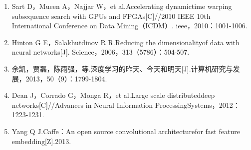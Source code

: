 \documentclass{article}
\begin{document}
\begin{enumerate}[labelsep = 0em, leftmargin = 10pt, itemindent = 0em]
        \item  Sart D，Mueen A，Najjar W，et al.Accelerating dynamictime warping subsequence search with GPUs and FPGAs[C]//2010 IEEE 10th International Conference on Data Mining（ICDM）. ieee，2010：1001-1006.
        \item  Hinton G E，Salakhutdinov R R.Reducing the dimensionalityof data with neural networks[J]. Science，2006，313（5786）：504-507.
        \item  余凯，贾磊，陈雨强，等.深度学习的昨天、今天和明天[J].计算机研究与发展，2013，50（9）：1799-1804.
        \item  Dean J，Corrado G，Monga R，et al.Large scale distributeddeep networks[C]//Advances in Neural Information ProcessingSystems，2012：1223-1231.
        \item  Yang Q J.Caffe：An open source convolutional architecturefor fast feature embedding[Z].2013.
    \end{enumerate}

    
\end{document}
